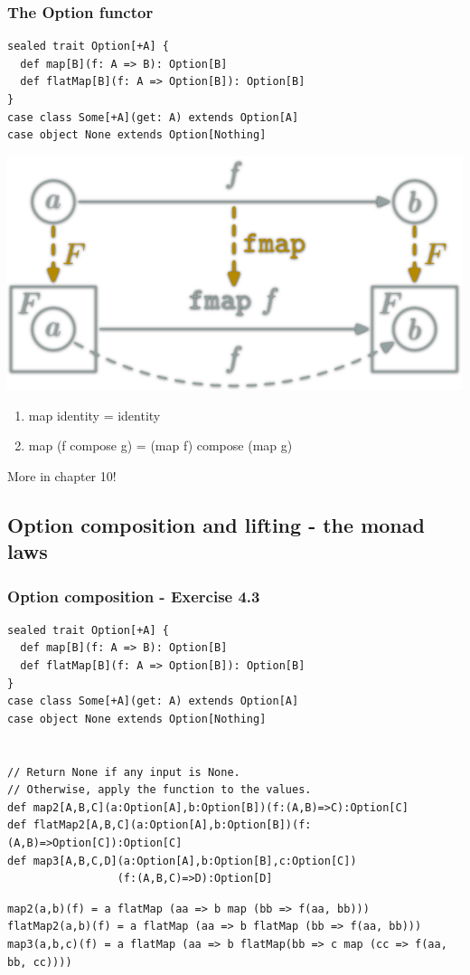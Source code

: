 \documentclass{beamer}
\begin{document}
\begin{frame}[fragile,t]
  \frametitle{The Option functor}
\begin{lstlisting}
sealed trait Option[+A] {
  def map[B](f: A => B): Option[B]
  def flatMap[B](f: A => Option[B]): Option[B]
}
case class Some[+A](get: A) extends Option[A]
case object None extends Option[Nothing]
\end{lstlisting}
  \begin{center}
    \includegraphics[scale=0.20]{boxfunctor.png}
  \end{center}
  \begin{enumerate}
    \item {\ttfamily map identity = identity}
    \item {\ttfamily map (f compose g) = (map f) compose (map g)}
  \end{enumerate}
  More in chapter 10!
\end{frame}

\subsection{Option composition and lifting - the monad laws}

\begin{frame}[fragile,t]
  \frametitle{Option composition - Exercise 4.3}
\begin{lstlisting}
sealed trait Option[+A] {
  def map[B](f: A => B): Option[B]
  def flatMap[B](f: A => Option[B]): Option[B]
}
case class Some[+A](get: A) extends Option[A]
case object None extends Option[Nothing]


// Return None if any input is None.
// Otherwise, apply the function to the values.
def map2[A,B,C](a:Option[A],b:Option[B])(f:(A,B)=>C):Option[C]
def flatMap2[A,B,C](a:Option[A],b:Option[B])(f:(A,B)=>Option[C]):Option[C]
def map3[A,B,C,D](a:Option[A],b:Option[B],c:Option[C])
                 (f:(A,B,C)=>D):Option[D]
\end{lstlisting}
\pause
\begin{lstlisting}
map2(a,b)(f) = a flatMap (aa => b map (bb => f(aa, bb)))
flatMap2(a,b)(f) = a flatMap (aa => b flatMap (bb => f(aa, bb)))
map3(a,b,c)(f) = a flatMap (aa => b flatMap(bb => c map (cc => f(aa, bb, cc))))
\end{lstlisting}
\end{frame}
\end{document}
